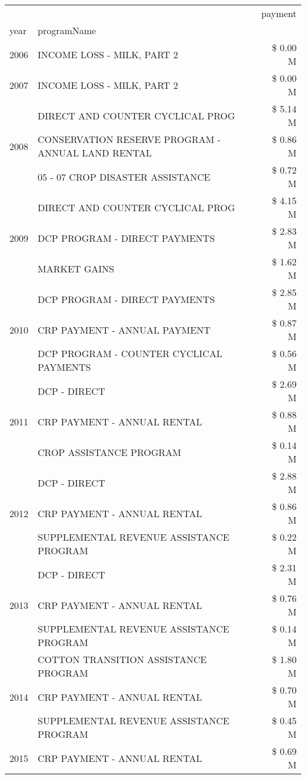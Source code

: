 \begin{tabular}{llr}
\toprule
 &  & payment \\
year & programName &  \\
\midrule
2006 & INCOME LOSS - MILK, PART 2 & \$ 0.00 M \\
\cline{1-3}
2007 & INCOME LOSS - MILK, PART 2 & \$ 0.00 M \\
\cline{1-3}
\multirow[t]{3}{*}{2008} & DIRECT AND COUNTER CYCLICAL PROG & \$ 5.14 M \\
 & CONSERVATION RESERVE PROGRAM - ANNUAL LAND RENTAL & \$ 0.86 M \\
 & 05 - 07 CROP DISASTER ASSISTANCE & \$ 0.72 M \\
\cline{1-3}
\multirow[t]{3}{*}{2009} & DIRECT AND COUNTER CYCLICAL PROG & \$ 4.15 M \\
 & DCP PROGRAM - DIRECT PAYMENTS & \$ 2.83 M \\
 & MARKET GAINS & \$ 1.62 M \\
\cline{1-3}
\multirow[t]{3}{*}{2010} & DCP PROGRAM - DIRECT PAYMENTS & \$ 2.85 M \\
 & CRP PAYMENT - ANNUAL PAYMENT & \$ 0.87 M \\
 & DCP PROGRAM - COUNTER CYCLICAL PAYMENTS & \$ 0.56 M \\
\cline{1-3}
\multirow[t]{3}{*}{2011} & DCP - DIRECT & \$ 2.69 M \\
 & CRP PAYMENT - ANNUAL RENTAL & \$ 0.88 M \\
 & CROP ASSISTANCE PROGRAM & \$ 0.14 M \\
\cline{1-3}
\multirow[t]{3}{*}{2012} & DCP - DIRECT & \$ 2.88 M \\
 & CRP PAYMENT - ANNUAL RENTAL & \$ 0.86 M \\
 & SUPPLEMENTAL REVENUE ASSISTANCE PROGRAM & \$ 0.22 M \\
\cline{1-3}
\multirow[t]{3}{*}{2013} & DCP - DIRECT & \$ 2.31 M \\
 & CRP PAYMENT - ANNUAL RENTAL & \$ 0.76 M \\
 & SUPPLEMENTAL REVENUE ASSISTANCE PROGRAM & \$ 0.14 M \\
\cline{1-3}
\multirow[t]{3}{*}{2014} & COTTON TRANSITION ASSISTANCE PROGRAM & \$ 1.80 M \\
 & CRP PAYMENT - ANNUAL RENTAL & \$ 0.70 M \\
 & SUPPLEMENTAL REVENUE ASSISTANCE PROGRAM & \$ 0.45 M \\
\cline{1-3}
\multirow[t]{3}{*}{2015} & CRP PAYMENT - ANNUAL RENTAL & \$ 0.69 M \\

\end{tabular}
